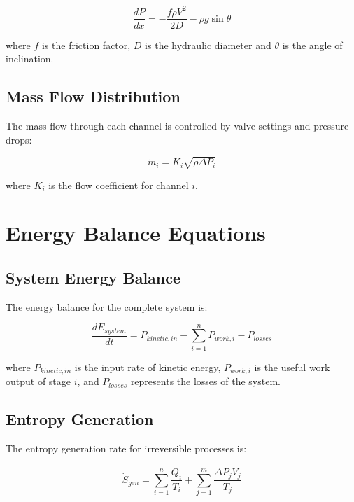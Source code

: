 \documentclass[12pt,a4paper]{article}
\begin{document}
\begin{equation}
\frac{dP}{dx} = -\frac{f \rho V^2}{2D} - \rho g \sin\theta
\end{equation}

where $f$ is the friction factor, $D$ is the hydraulic diameter and $\theta$ is the angle of inclination.

\subsection{Mass Flow Distribution}

The mass flow through each channel is controlled by valve settings and pressure drops:

\begin{equation}
\dot{m}_i = K_i \sqrt{\rho \Delta P_i}
\end{equation}

where $K_i$ is the flow coefficient for channel $i$.

\section{Energy Balance Equations}

\subsection{System Energy Balance}

The energy balance for the complete system is:

\begin{equation}
\frac{dE_{system}}{dt} = P_{kinetic,in} - \sum_{i=1}^{n} P_{work,i} - P_{losses}
\end{equation}

where $P_{kinetic,in}$ is the input rate of kinetic energy, $P_{work,i}$ is the useful work output of stage $i$, and $P_{losses}$ represents the losses of the system.

\subsection{Entropy Generation}

The entropy generation rate for irreversible processes is:

\begin{equation}
\dot{S}_{gen} = \sum_{i=1}^{n} \frac{\dot{Q}_i}{T_i} + \sum_{j=1}^{m} \frac{\Delta P_j \dot{V}_j}{T_j}
\end{equation}
\end{document}
